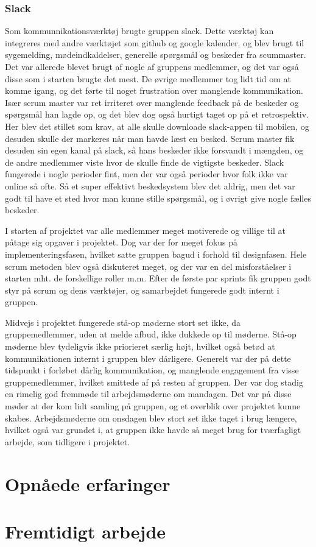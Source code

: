 \subsubsection{Slack}
Som kommunnikationsværktøj brugte gruppen slack. Dette værktøj kan integreres med andre værktøjet som github og google kalender, og blev brugt til 
sygemelding, mødeindkaldelser, generelle spørgsmål og beskeder fra scummaster. Det var allerede blevet brugt af nogle af gruppens medlemmer, og det var 
også disse som i starten brugte det mest. De øvrige medlemmer tog lidt tid om at komme igang, og det førte til noget frustration over manglende kommunikation.
Især scrum master var ret irriteret over manglende feedback på de beskeder og spørgsmål han lagde op, og det blev dog også hurtigt taget op på et retrospektiv.
Her blev det stillet som krav, at alle skulle downloade slack-appen til mobilen, og desuden skulle der markeres når man havde læst en besked. 
Scrum master fik desuden sin egen kanal på slack, så hans beskeder ikke forsvandt i mængden, og de andre medlemmer viste hvor de skulle finde de vigtigste 
beskeder. Slack fungerede i nogle perioder fint, men der var også perioder hvor folk ikke var online så ofte. Så et super effektivt beskedsystem blev det aldrig, 
men det var godt til have et sted hvor man kunne stille spørgsmål, og i øvrigt give nogle fælles beskeder.

I starten af projektet var alle medlemmer meget motiverede og villige til at påtage sig opgaver i projektet. Dog var der for meget fokus på implementeringsfasen,
hvilket satte gruppen bagud i forhold til designfasen.
Hele scrum metoden blev også diskuteret meget, og der var en del misforståelser i starten mht. de forskellige roller m.m. Efter de første par sprints
fik gruppen godt styr på scrum og dens værktøjer, og samarbejdet fungerede godt internt i gruppen.

Midvejs i projektet fungerede stå-op møderne stort set ikke, da gruppemedlemmer, uden at melde afbud, ikke dukkede op til møderne. Stå-op møderne
blev tydeligvis ikke priorieret særlig højt, hvilket også betød at kommunikationen internt i gruppen blev dårligere. Generelt var der på dette tidspunkt i forløbet
dårlig kommunikation, og manglende engagement fra visse gruppemedlemmer, hvilket smittede af på resten af gruppen.
Der var dog stadig en rimelig god fremmøde til arbejdsmøderne om mandagen. Det var på disse møder at der kom lidt samling på gruppen, og et overblik over projektet
kunne skabes. Arbejdsmøderne om onsdagen blev stort set ikke taget i brug længere, hvilket også var grundet i, at gruppen ikke havde så meget brug
for tværfagligt arbejde, som tidligere i projektet.

\section{Opnåede erfaringer}

\section{Fremtidigt arbejde}
